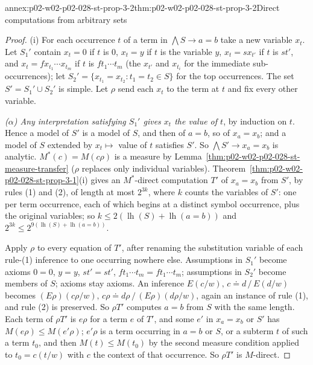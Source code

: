 \begin{annexitem}{annex:p02-w02-p02-028-st-prop-3-2}{thm:p02-w02-p02-028-st-prop-3-2}{Direct computations from arbitrary sets}
\begin{proof}
(i)  For each occurrence \(t\) of a term in \(\bigwedge S\to a=b\) take a new
variable \(x_t\).  Let \(S_1'\) contain \(x_t=0\) if \(t\) is \(0\),
\(x_t=y\) if \(t\) is the variable \(y\), \(x_t=sx_{t'}\) if \(t\) is
\(st'\), and \(x_t=fx_{t_1}\cdots x_{t_m}\) if \(t\) is \(ft_1\cdots t_m\)
(the \(x_{t'}\) and \(x_{t_i}\) for the immediate sub-occurrences); let
\(S_2'=\{x_{t_1}=x_{t_2}:t_1=t_2\in S\}\) for the top occurrences.  The set
\(S'=S_1'\cup S_2'\) is simple.  Let \(\rho\) send each \(x_t\) to the term
at \(t\) and fix every other variable.

\emph{(\(\alpha\)) Any interpretation satisfying \(S_1'\) gives \(x_t\) the
value of \(t\)}, by induction on \(t\).  Hence a model of \(S'\) is a model of
\(S\), and then of \(a=b\), so of \(x_a=x_b\); and a model of \(S\) extended
by \(x_t\mapsto\) value of \(t\) satisfies \(S'\).  So
\(\bigwedge S'\to x_a=x_b\) is analytic.  \(M^*(c)=M(c\rho)\) is a measure by
Lemma~\ref{thm:p02-w02-p02-028-st-measure-transfer} (\(\rho\) replaces only
individual variables).  Theorem~\ref{thm:p02-w02-p02-028-st-prop-3-1}(i)
gives an \(M^*\)-direct computation \(T'\) of \(x_a=x_b\) from \(S'\), by
rules (1) and (2), of length at most \(2^{3k}\), where \(k\) counts the
variables of \(S'\): one per term occurrence, each of which begins at a
distinct symbol occurrence, plus the original variables; so
\(k\leq2(\operatorname{lh}(S)+\operatorname{lh}(a=b))\) and
\(2^{3k}\leq2^{9(\operatorname{lh}(S)+\operatorname{lh}(a=b))}\).

Apply \(\rho\) to every equation of \(T'\), after renaming the substitution
variable of each rule-(1) inference to one occurring nowhere else.
Assumptions in \(S_1'\) become axioms \(0=0\), \(y=y\), \(st'=st'\),
\(ft_1\cdots t_m=ft_1\cdots t_m\); assumptions in \(S_2'\) become members of
\(S\); axioms stay axioms.  An inference
\(E(c/w),\,c\doteq d\,/\,E(d/w)\) becomes
\((E\rho)(c\rho/w),\,c\rho\doteq d\rho\,/\,(E\rho)(d\rho/w)\), again an
instance of rule (1), and rule (2) is preserved.  So \(\rho T'\) computes
\(a=b\) from \(S\) with the same length.  Each term of \(\rho T'\) is
\(e\rho\) for a term \(e\) of \(T'\), and some \(e'\) in \(x_a=x_b\) or \(S'\)
has \(M(e\rho)\leq M(e'\rho)\); \(e'\rho\) is a term occurring in \(a=b\) or
\(S\), or a subterm \(t\) of such a term \(t_0\), and then \(M(t)\leq M(t_0)\)
by the second measure condition applied to \(t_0=c(t/w)\) with \(c\) the
context of that occurrence.  So \(\rho T'\) is \(M\)-direct.


\end{proof}
\end{annexitem}
